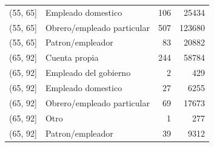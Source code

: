 \begin{longtable}{llrr}
(55, 65] & Empleado domestico & 106 & 25434 \\
(55, 65] & Obrero/empleado particular & 507 & 123680 \\
(55, 65] & Patron/empleador & 83 & 20882 \\
(65, 92] & Cuenta propia & 244 & 58784 \\
(65, 92] & Empleado del gobierno & 2 & 429 \\
(65, 92] & Empleado domestico & 27 & 6255 \\
(65, 92] & Obrero/empleado particular & 69 & 17673 \\
(65, 92] & Otro & 1 & 277 \\
(65, 92] & Patron/empleador & 39 & 9312 \\
\end{longtable}
